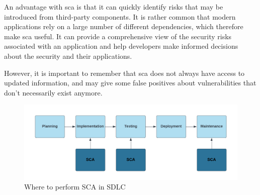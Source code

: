 An advantage with \acrshort{sca} is that it can quickly identify risks that may be introduced from third-party components. It is rather common that modern applications rely on a large number of different dependencies, which therefore make \acrshort{sca} useful. It can provide a comprehensive view of the security risks associated with an application and help developers make informed decisions about the security and their applications. 

However, it is important to remember that \acrshort{sca} does not always have access to updated information, and may give some false positives about vulnerabilities that don't necessarily exist anymore. 
\\
\begin{figure}[H]
    \centering
    \includegraphics[width=0.8\columnwidth]{Images/sca.png}
    \caption{Where to perform SCA in SDLC} 
    \label{fig: Where to perform SCA in SDLC}
\end{figure}

\newpage
